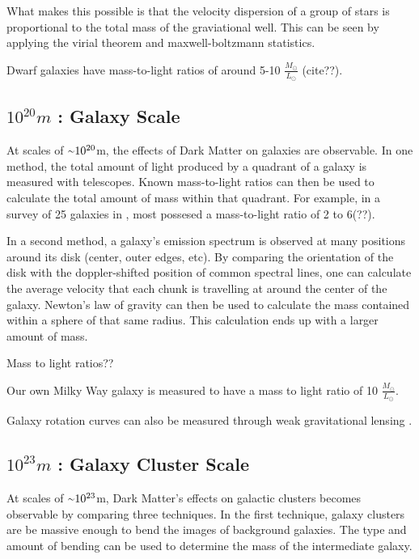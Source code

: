 What makes this possible is that the velocity dispersion of a group of stars is proportional to the total mass of the graviational well.
This can be seen by applying the virial theorem and maxwell-boltzmann statistics.

Dwarf galaxies have mass-to-light ratios of around 5-10 $\frac{M_\odot}{L_\odot}$ (cite??).



\subsection{$10^{20}m$ : Galaxy Scale}
%
At scales of $\nicetilde 10^{20}$m, the effects of Dark Matter on galaxies are observable.
In one method, the total amount of light produced by a quadrant of a galaxy is measured with telescopes.
Known mass-to-light ratios can then be used to calculate the total amount of mass within that quadrant.
For example, in a survey of 25 galaxies in \cite{galaxy_mass_light_ratio}, most possesed a mass-to-light ratio of 2 to 6(??).


In a second method, a galaxy's emission spectrum is observed at many positions around its disk (center, outer edges, etc).
By comparing the orientation of the disk with the doppler-shifted position of common spectral lines, one can calculate the average velocity that each chunk is travelling at around the center of the galaxy.
Newton's law of gravity can then be used to calculate the mass contained within a sphere of that same radius.
This calculation ends up with a larger amount of mass.

Mass to light ratios??

Our own Milky Way galaxy is measured to have a mass to light ratio of 10 $\frac{M_{\odot}}{L_{\odot}}$.

Galaxy rotation curves can also be measured through weak gravitational lensing \cite{weak_lensing_2001}.


\subsection{$10^{23}m$ : Galaxy Cluster Scale}
%
At scales of $\nicetilde 10^{23}$m, Dark Matter's effects on galactic clusters becomes observable by comparing three techniques.
In the first technique, galaxy clusters are be massive enough to bend the images of background galaxies.
The type and amount of bending can be used to determine the mass of the intermediate galaxy.

